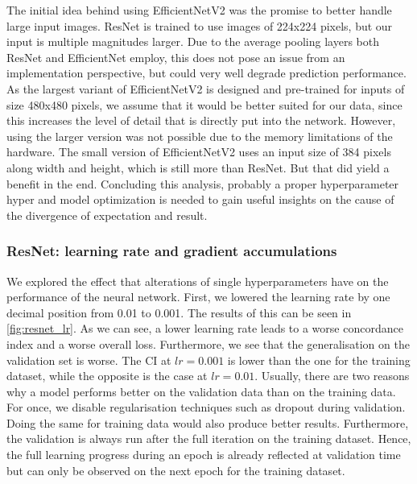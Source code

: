 The initial idea behind using EfficientNetV2 was the promise to better handle large input images. ResNet is trained to use images of 224x224 pixels, but our input is multiple magnitudes larger. Due to the average pooling layers both ResNet and EfficientNet employ, this does not pose an issue from an implementation perspective, but could very well degrade prediction performance. As the largest variant of EfficientNetV2 is designed and pre-trained for inputs of size 480x480 pixels, we assume that it would be better suited for our data, since this increases the level of detail that is directly put into the network. However, using the larger version was not possible due to the memory limitations of the hardware. The small version of EfficientNetV2 uses an input size of 384 pixels along width and height, which is still more than ResNet. But that did yield a benefit in the end.
Concluding this analysis, probably a proper hyperparameter hyper and model optimization is needed to gain useful insights on the cause of the divergence of expectation and result. 

\subsubsection{ResNet: learning rate and gradient accumulations}

We explored the effect that alterations of single hyperparameters have on the performance of the neural network. First, we lowered the learning rate by one decimal position from 0.01 to 0.001. The results of this can be seen in \ref{fig:resnet_lr}. As we can see, a lower learning rate leads to a worse concordance index and a worse overall loss. Furthermore, we see that the generalisation on the validation set is worse. The CI at \(lr=0.001\) is lower than the one for the training dataset, while the opposite is the case at \(lr=0.01\). Usually, there are two reasons why a model performs better on the validation data than on the training data. For once, we disable regularisation techniques such as dropout during validation. Doing the same for training data would also produce better results. Furthermore, the validation is always run after the full iteration on the training dataset. Hence, the full learning progress during an epoch is already reflected at validation time but can only be observed on the next epoch for the training dataset. 

